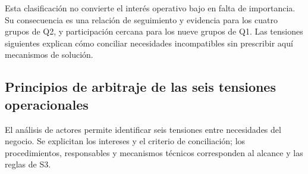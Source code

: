 Esta clasificación no convierte el interés operativo bajo en falta de importancia. Su consecuencia es una relación de seguimiento y evidencia para los cuatro grupos de Q2, y participación cercana para los nueve grupos de Q1. Las tensiones siguientes explican cómo conciliar necesidades incompatibles sin prescribir aquí mecanismos de solución.

\subsection{Principios de arbitraje de las seis tensiones operacionales}\label{sec:2-arbitraje}

El análisis de actores permite identificar seis tensiones entre necesidades del negocio. Se explicitan los intereses y el criterio de conciliación; los procedimientos, responsables y mecanismos técnicos corresponden al alcance y las reglas de S3.

